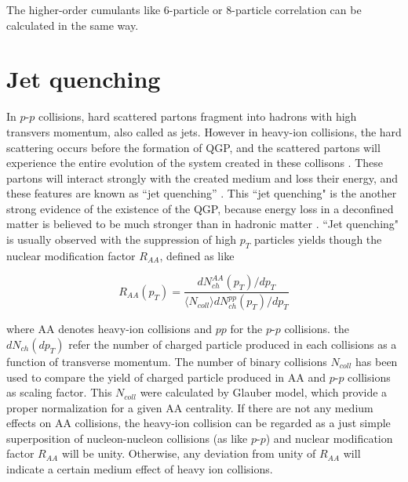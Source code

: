 The higher-order cumulants like 6-particle or 8-particle correlation can be calculated in the same way.

\section{Jet quenching}


In $p$-$p$ collisions, hard scattered partons fragment into hadrons with high transvers momentum, also called as jets. However in heavy-ion collisions, the hard scattering occurs before the formation of QGP, and the scattered partons will experience the entire evolution of the system created in these collisons \cite{Enterria:2009am}.
These partons will interact strongly with the created medium and loss their energy, and these features are known as ``jet quenching''  \cite{PhysRevLett.68.1480}. This ``jet quenching" is the another strong evidence of the existence of the QGP, because energy loss in a deconfined matter is believed to be much stronger than in hadronic matter \cite{PhysRevLett.68.1480}. ``Jet quenching" is usually observed with the suppression of high $p_T$ particles yields though the nuclear modification factor $R_{AA}$, defined as like 
 
 \begin{equation}
	R_{AA}(p_T) = \frac{dN_{ch}^{AA}(p_T)/dp_T}{\langle N_{coll} \rangle dN_{ch}^{pp}(p_T)/dp_T}
\end{equation}

where AA denotes heavy-ion collisions and $pp$ for the $p$-$p$ collisions. the $dN_{ch}(dp_T)$ refer the number of charged particle produced in each collisions as a function of transverse momentum. The number of binary collisions $N_{coll}$ has been used to compare the yield of charged particle produced in AA and $p$-$p$ collisions as scaling factor. This $N_{coll}$ were calculated by Glauber model, which provide a proper normalization for a given AA centrality. 
  If there are not any medium effects on AA collisions, the heavy-ion collision can be regarded as a just simple superposition of nucleon-nucleon collisions (as like $p$-$p$) and nuclear modification factor $R_{AA}$ will be unity. Otherwise, any deviation from unity of $R_{AA}$  will indicate a certain medium effect of heavy ion collisions. 
  


